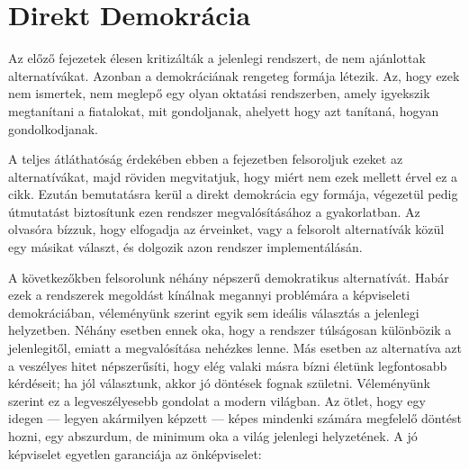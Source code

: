 \section{Direkt Demokrácia}

Az előző fejezetek élesen kritizálták a jelenlegi rendszert, de nem ajánlottak alternatívákat.
Azonban a demokráciának rengeteg formája létezik. Az, hogy ezek nem ismertek, nem meglepő egy
olyan oktatási rendszerben, amely igyekszik megtanítani a fiatalokat, mit gondoljanak, ahelyett
hogy azt tanítaná, hogyan gondolkodjanak.

A teljes átláthatóság érdekében ebben a fejezetben felsoroljuk ezeket az alternatívákat, majd
röviden megvitatjuk, hogy miért nem ezek mellett érvel ez a cikk. Ezután bemutatásra kerül a
direkt demokrácia egy formája, végezetül pedig útmutatást biztosítunk ezen rendszer megvalósításához
a gyakorlatban. Az olvasóra bízzuk, hogy elfogadja az érveinket, vagy a felsorolt alternatívák közül
egy másikat választ, és dolgozik azon rendszer implementálásán.

A következőkben felsorolunk néhány népszerű demokratikus alternatívát. Habár ezek a rendszerek megoldást
kínálnak megannyi problémára a képviseleti demokráciában, véleményünk szerint egyik sem ideális választás
a jelenlegi helyzetben. Néhány esetben ennek oka, hogy a rendszer túlságosan különbözik a jelenlegitől,
emiatt a megvalósítása nehézkes lenne. Más esetben az alternatíva azt a veszélyes hitet népszerűsíti,
hogy elég valaki másra bízni életünk legfontosabb kérdéseit; ha jól választunk, akkor jó döntések fognak
születni. Véleményünk szerint ez a legveszélyesebb gondolat a modern világban. Az ötlet, hogy egy idegen
--- legyen akármilyen képzett --- képes mindenki számára megfelelő döntést hozni, egy abszurdum, de
minimum oka a világ jelenlegi helyzetének. A jó képviselet egyetlen garanciája az önképviselet:

